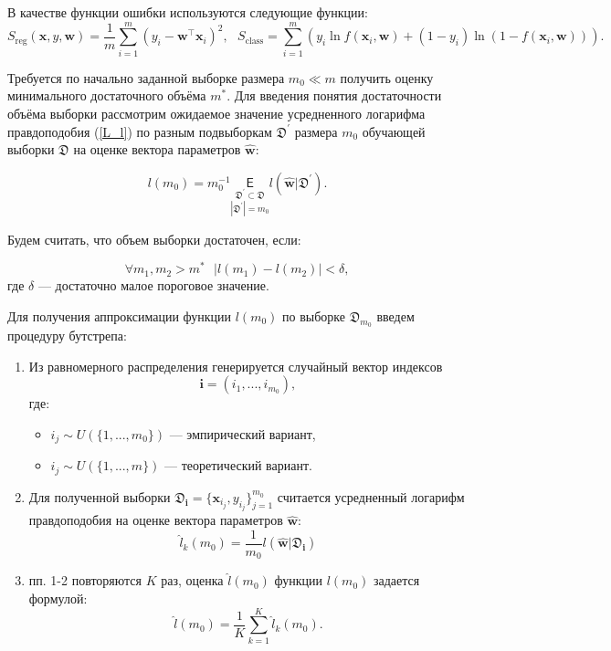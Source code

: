 \documentclass[12pt,twoside]{article}
\begin{document}
В качестве функции ошибки используются следующие функции:
\begin{equation}\label{MSE_CE}
S_{\text{reg}}(\mathbf{x}, y, \textbf{w}) = \frac{1}{m}\sum\limits_{i=1}^{m}(y_i - \textbf{w}^{\top}\mathbf{x}_i )^2, ~~~ S_{\text{class}} = \sum\limits_{i=1}^{m}(y_i\ln f(\mathbf{x}_i, \mathbf{w}) + (1 - y_i)\ln(1 - f(\mathbf{x}_i, \mathbf{w}))).
\end{equation}

Требуется по начально заданной выборке размера $m_0 \ll m$ получить оценку минимального достаточного объёма $m^{*}$. Для введения понятия достаточности объёма  выборки рассмотрим ожидаемое значение усредненного логарифма правдоподобия (\ref{L_l}) по разным подвыборкам $\mathfrak D^{\prime}$ размера $m_0$ обучающей выборки $\mathfrak{D}$ на оценке вектора параметров $\hat{\mathbf{w}}$:

$$
l(m_0) = m_0^{-1}\underset{|\mathfrak D^{\prime}| = m_0}{\underset{\mathfrak D^{\prime} \subset \mathfrak D}{\mathsf E}} l(\hat{\mathbf{w}} | \mathfrak D^{\prime}).
$$

Будем считать, что объем выборки достаточен, если:

$$
\forall m_1, m_2 > m^* ~~~ |l(m_1) - l(m_2)| < \delta,
$$
где $\delta$ --- достаточно малое пороговое значение.

Для получения аппроксимации функции $l(m_0)$ по выборке $\mathfrak D_{m_0}$ введем процедуру бутстрепа:

\begin{enumerate}
	\item Из равномерного распределения генерируется случайный вектор индексов 
$$
\mathbf{i} = (i_1, ..., i_{m_0}),
$$
где:
	\begin{itemize}
		\item $i_j \sim U(\{1, ..., m_0\})$ --- эмпирический вариант,
		\item $i_j \sim U(\{1, ..., m\})$ --- теоретический вариант.
	\end{itemize}
	\item Для полученной выборки $\mathfrak D_{\mathbf{i}} = \{\mathbf{x}_{i_j}, y_{i_j}\}_{j=1}^{m_0}$ считается усредненный логарифм правдоподобия на оценке вектора параметров $\hat{\mathbf{w}}$:
$$
\hat{l}_{k}(m_0) = \frac{1}{m_0}l(\hat{\mathbf{w}} | \mathfrak D_{\mathbf{i}})
$$
	\item пп. 1-2 повторяются $K$ раз, оценка $\hat{l}(m_0)$ функции $l(m_0)$ задается формулой:
$$
\hat{l}(m_0) = \frac{1}{K}\sum\limits_{k=1}^K \hat{l}_{k}(m_0).
$$
\end{enumerate}
\end{document}
